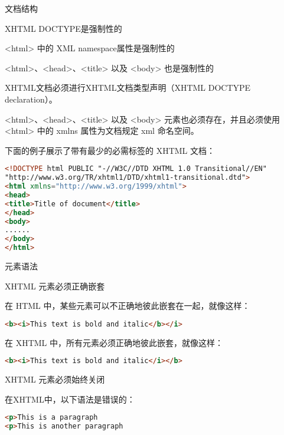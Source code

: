 \begin{compactitem}
\item 文档结构

	\begin{compactitem}
	\item XHTML DOCTYPE是强制性的
	\item <html> 中的 XML namespace属性是强制性的
	\item <html>、<head>、<title> 以及 <body> 也是强制性的
	\end{compactitem}

XHTML文档必须进行XHTML文档类型声明（XHTML DOCTYPE declaration）。

<html>、<head>、<title> 以及 <body> 元素也必须存在，并且必须使用 <html> 中的 xmlns 属性为文档规定 xml 命名空间。

下面的例子展示了带有最少的必需标签的 XHTML 文档：

\begin{lstlisting}[language=HTML]
<!DOCTYPE html PUBLIC "-//W3C//DTD XHTML 1.0 Transitional//EN"
"http://www.w3.org/TR/xhtml1/DTD/xhtml1-transitional.dtd">
<html xmlns="http://www.w3.org/1999/xhtml">
<head>
<title>Title of document</title>
</head>
<body>
......
</body>
</html>
\end{lstlisting}

\item 元素语法

	\begin{compactitem}
	\item XHTML 元素必须正确嵌套

在 HTML 中，某些元素可以不正确地彼此嵌套在一起，就像这样：

\begin{lstlisting}[language=HTML]
	<b><i>This text is bold and italic</b></i>
\end{lstlisting}

在 XHTML 中，所有元素必须正确地彼此嵌套，就像这样：

\begin{lstlisting}[language=HTML]
	<b><i>This text is bold and italic</i></b>
\end{lstlisting}

	\item XHTML 元素必须始终关闭

在XHTML中，以下语法是错误的：

\begin{lstlisting}[language=HTML]
<p>This is a paragraph
<p>This is another paragraph
\end{lstlisting}


\end{compactitem}
\end{compactitem}

